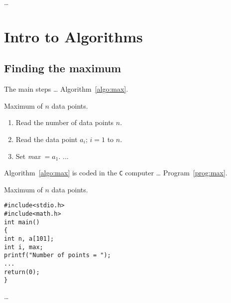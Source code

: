 \documentclass[a4paper,openany]{report}
\begin{document}
…
\chapter{Intro to Algorithms}
    \section{Finding the maximum}
    The main steps … Algorithm~\ref{algo:max}.
    \begin{algorithm}
        \caption{Maximum of $n$ data points.}
        \label{algo:max}
        \begin{enumerate}
            \item Read the number of data points $n$.
            \item Read the data point $a_i$;
            $i=1$ to $n$.
            \item Set {\it max} $=a_1$.
            ...
        \end{enumerate}
    \end{algorithm}
%
    Algorithm~\ref{algo:max} is coded in the {\tt C} computer … Program~\ref{prog:max}.
    \begin{program}
        \caption{Maximum of $n$ data points.}
        \label{prog:max}
        \begin{verbatim}
#include<stdio.h>
#include<math.h>
int main()
{
int n, a[101];
int i, max;
printf("Number of points = ");
...
return(0);
}
    \end{verbatim}
    \end{program}
    …
\end{document}
